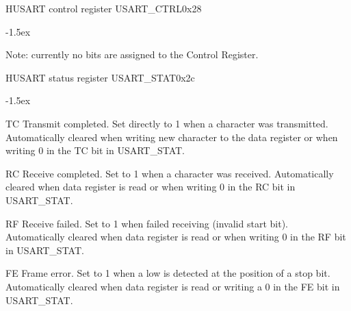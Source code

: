 \documentclass[12pt]{article}
\begin{document}
\begin{register}{H}{USART control register USART\_CTRL}{0x28}
\label{usartctrl}
%
\regnewline%
\end{register}
\begin{regdesc}[0.6\textwidth]\begin{reglist}[00000]
\itemsep-1.5ex
\item [Note:] currently no bits are assigned to the Control Register.
\end{reglist}\end{regdesc}


\begin{register}{H}{USART status register USART\_STAT}{0x2c}
\label{usartstat}
%
%
%
%
%
%
\regnewline%
\end{register}
\begin{regdesc}[0.8\textwidth]\begin{reglist}[0000]
\itemsep-1.5ex
\item[TC] Transmit completed. Set directly to 1 when a character was transmitted. Automatically cleared when writing new character to the data register or when writing 0 in the TC bit in USART\_STAT.
\item[RC] Receive completed. Set to 1 when a character was received. Automatically cleared when data register is read or when writing 0 in the RC bit in USART\_STAT.
\item[RF] Receive failed. Set to 1 when failed receiving (invalid start bit). Automatically cleared when data register is read or when writing 0 in the RF bit in USART\_STAT.
\item [FE] Frame error. Set to 1 when a low is detected at the position of a stop bit. Automatically cleared when data register is read or writing a 0 in the FE bit in USART\_STAT.
\end{reglist}\end{regdesc}

%

%
\end{document}
